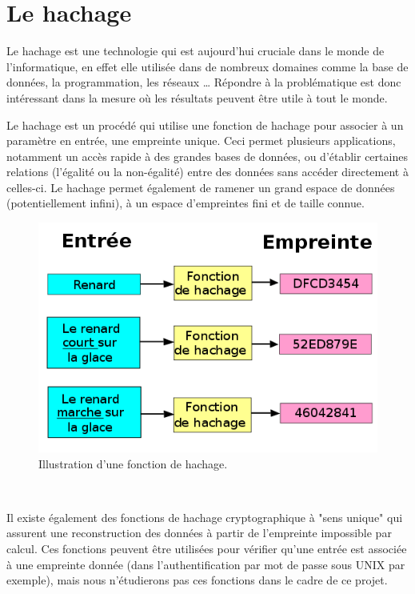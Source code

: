 \documentclass[final,twoside,twocolumn,10pt]{scrartcl}
\begin{document}
\section{Le hachage}
	Le hachage est une technologie qui est aujourd’hui cruciale dans le monde de l’informatique, en effet elle utilisée dans de nombreux domaines comme la base de données, la programmation, les réseaux … Répondre à la problématique est donc intéressant dans la mesure où les résultats peuvent être utile à tout le monde.\\
	\par Le hachage est un procédé qui utilise une fonction de hachage pour associer à un paramètre en entrée, une empreinte unique. Ceci permet plusieurs applications, notamment un accès rapide à des grandes bases de données, ou d'établir certaines relations (l'égalité ou la non-égalité) entre des données sans accéder directement à celles-ci. Le hachage permet également de ramener un grand espace de données (potentiellement infini), à un espace d'empreintes fini et de taille connue.\\
	\begin{figure}[h!]
		\begin{center}
			\includegraphics[scale=0.3]{figures/hash}
		\end{center}
		\caption{Illustration d'une fonction de hachage.}
		\label{fig:1}
	\end{figure}\\
	\par Il existe également des fonctions de hachage cryptographique à "sens unique" qui assurent une reconstruction des données à partir de l'empreinte impossible par calcul. Ces fonctions peuvent être utilisées pour vérifier qu'une entrée est associée à une empreinte donnée (dans l'authentification par mot de passe sous UNIX par exemple), mais nous n'étudierons pas ces fonctions dans le cadre de ce projet.
	
\end{document}
